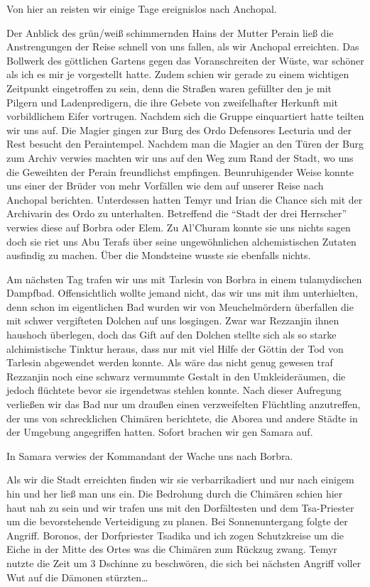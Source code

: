 Von hier an reisten wir einige Tage ereignislos nach Anchopal.

Der Anblick des grün/weiß schimmernden Hains der Mutter Perain ließ die Anstrengungen der Reise schnell von uns fallen, als wir Anchopal erreichten. Das Bollwerk des göttlichen Gartens gegen das Voranschreiten der Wüste, war schöner als ich es mir je vorgestellt hatte. Zudem schien wir gerade zu einem wichtigen Zeitpunkt eingetroffen zu sein, denn die Straßen waren gefüllter den je mit Pilgern und Ladenpredigern, die ihre Gebete von zweifelhafter Herkunft mit vorbildlichem Eifer vortrugen. Nachdem sich die Gruppe einquartiert hatte teilten wir uns auf. Die Magier gingen zur Burg des Ordo Defensores Lecturia und der Rest besucht den Peraintempel. Nachdem man die Magier an den Türen der Burg zum Archiv verwies machten wir uns auf den Weg zum Rand der Stadt, wo uns die Geweihten der Perain freundlichst empfingen. Beunruhigender Weise konnte uns einer der Brüder von mehr Vorfällen wie dem auf unserer Reise nach Anchopal berichten. Unterdessen hatten Temyr und Irian die Chance sich mit der Archivarin des Ordo zu unterhalten. Betreffend die ``Stadt der drei Herrscher'' verwies diese auf Borbra oder Elem. Zu Al'Churam konnte sie uns nichts sagen doch sie riet uns Abu Terafs über seine ungewöhnlichen alchemistischen Zutaten ausfindig zu machen. Über die Mondsteine wusste sie ebenfalls nichts.

Am nächsten Tag trafen wir uns mit Tarlesin von Borbra in einem tulamydischen Dampfbad. Offensichtlich wollte jemand nicht, das wir uns mit ihm unterhielten, denn schon im eigentlichen Bad wurden wir von Meuchelmördern überfallen die mit schwer vergifteten Dolchen auf uns losgingen. Zwar war Rezzanjin ihnen haushoch überlegen, doch das Gift auf den Dolchen stellte sich als so starke alchimistische Tinktur heraus, dass nur mit viel Hilfe der Göttin der Tod von Tarlesin abgewendet werden konnte. Als wäre das nicht genug gewesen traf Rezzanjin noch eine schwarz vermummte Gestalt in den Umkleideräumen, die jedoch flüchtete bevor sie irgendetwas stehlen konnte. Nach dieser Aufregung verließen wir das Bad nur um draußen einen verzweifelten Flüchtling anzutreffen, der uns von schrecklichen Chimären berichtete, die Aborea und andere Städte in der Umgebung angegriffen hatten. Sofort brachen wir gen Samara auf.

In Samara verwies der Kommandant der Wache uns nach Borbra.

Als wir die Stadt erreichten finden wir sie verbarrikadiert und nur nach einigem hin und her ließ man uns ein. Die Bedrohung durch die Chimären schien hier haut nah zu sein und wir trafen uns mit den Dorfältesten und dem Tsa-Priester um die bevorstehende Verteidigung zu planen. Bei Sonnenuntergang folgte der Angriff. Boronos, der Dorfpriester Tsadika und ich zogen Schutzkreise um die Eiche in der Mitte des Ortes was die Chimären zum Rückzug zwang. Temyr nutzte die Zeit um 3 Dschinne zu beschwören, die sich bei nächsten Angriff voller Wut auf die Dämonen stürzten\dots

